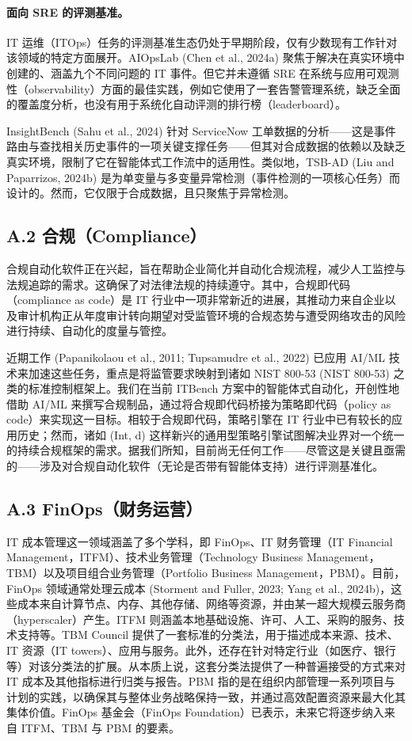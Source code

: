 \paragraph{面向 SRE 的评测基准。}
IT 运维（ITOps）任务的评测基准生态仍处于早期阶段，仅有少数现有工作针对该领域的特定方面展开。AIOpsLab (Chen et al., 2024a) 聚焦于解决在真实环境中创建的、涵盖九个不同问题的 IT 事件。但它并未遵循 SRE 在系统与应用可观测性（observability）方面的最佳实践，例如它使用了一套告警管理系统，缺乏全面的覆盖度分析，也没有用于系统化自动评测的排行榜（leaderboard）。

InsightBench (Sahu et al., 2024) 针对 ServiceNow 工单数据的分析——这是事件路由与查找相关历史事件的一项关键支撑任务——但其对合成数据的依赖以及缺乏真实环境，限制了它在智能体式工作流中的适用性。类似地，TSB-AD (Liu and Paparrizos, 2024b) 是为单变量与多变量异常检测（事件检测的一项核心任务）而设计的。然而，它仅限于合成数据，且只聚焦于异常检测。

\subsection{A.2 合规（Compliance）}

合规自动化软件正在兴起，旨在帮助企业简化并自动化合规流程，减少人工监控与法规追踪的需求。这确保了对法律法规的持续遵守。其中，合规即代码（compliance as code）是 IT 行业中一项非常新近的进展，其推动力来自企业以及审计机构正从年度审计转向期望对受监管环境的合规态势与遭受网络攻击的风险进行持续、自动化的度量与管控。

近期工作 (Papanikolaou et al., 2011; Tupsamudre et al., 2022) 已应用 AI/ML 技术来加速这些任务，重点是将监管要求映射到诸如 NIST 800-53 (NIST 800-53) 之类的标准控制框架上。我们在当前 ITBench 方案中的智能体式自动化，开创性地借助 AI/ML 来撰写合规制品，通过将合规即代码桥接为策略即代码（policy as code）来实现这一目标。相较于合规即代码，策略引擎在 IT 行业中已有较长的应用历史；然而，诸如 (Int, d) 这样新兴的通用型策略引擎试图解决业界对一个统一的持续合规框架的需求。据我们所知，目前尚无任何工作——尽管这是关键且亟需的——涉及对合规自动化软件（无论是否带有智能体支持）进行评测基准化。

\subsection{A.3 FinOps（财务运营）}

IT 成本管理这一领域涵盖了多个学科，即 FinOps、IT 财务管理（IT Financial Management，ITFM）、技术业务管理（Technology Business Management，TBM）以及项目组合业务管理（Portfolio Business Management，PBM）。目前，FinOps 领域通常处理云成本 (Storment and Fuller, 2023; Yang et al., 2024b)，这些成本来自计算节点、内存、其他存储、网络等资源，并由某一超大规模云服务商（hyperscaler）产生。ITFM 则涵盖本地基础设施、许可、人工、采购的服务、技术支持等。TBM Council 提供了一套标准的分类法，用于描述成本来源、技术、IT 资源（IT towers）、应用与服务。此外，还存在针对特定行业（如医疗、银行等）对该分类法的扩展。从本质上说，这套分类法提供了一种普遍接受的方式来对 IT 成本及其他指标进行归类与报告。PBM 指的是在组织内部管理一系列项目与计划的实践，以确保其与整体业务战略保持一致，并通过高效配置资源来最大化其集体价值。FinOps 基金会（FinOps Foundation）已表示，未来它将逐步纳入来自 ITFM、TBM 与 PBM 的要素。

